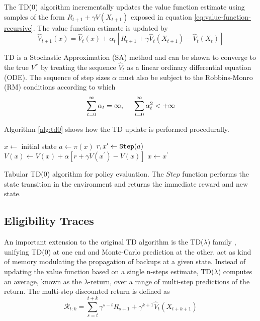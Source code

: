 The TD(0) algorithm incrementally updates the value function estimate using samples
of the form $R_{t+1} + \gamma V(X_{t+1})$ exposed in equation \ref{eq:value-function-recursive}. The value function estimate is updated by
\begin{equation}
\hat{V}_{t+1}(x) = \hat{V}_{t}(x) + \alpha_t \left[ R_{t+1} + \gamma \hat{V}_t (X_{t+1})
- \hat{V}_t(X_t)\right] \label{eq:tdupdate}
\end{equation}

TD is a Stochastic Approximation (SA) method and can be shown to converge \parencite{Csaba2010} to the true $V^\pi$ by treating the sequence $\hat{V}_t$ as a linear ordinary differential equation (ODE). The sequence of step sizes $\alpha$ must also be subject to the Robbins-Monro (RM) conditions according to which
\begin{equation}
\sum_{t=0}^\infty \alpha_t = \infty, \hspace{5mm} 
\sum_{t=0}^\infty \alpha_t^2 < + \infty
\end{equation}

Algorithm \ref{alg:td0} shows how the TD update is performed procedurally.

\begin{algorithm}
\DontPrintSemicolon
{}
$x \leftarrow$ initial state\;
 {
$a \leftarrow \pi(x)$\;
$r, x^\prime \leftarrow \FuncSty{Step}(a)$\;
$V(x) \leftarrow V(x) + \alpha\left[ r + \gamma V(x^\prime) - V(x) \right]$ \;
$x \leftarrow x^\prime$
}
\caption{Tabular TD(0) algorithm for policy evaluation. The $Step$ function performs
the state transition in the environment and returns the immediate reward and new state.}
\label{alg:td0}
\end{algorithm}

\subsection{Eligibility Traces}

An important extension to the original TD algorithm is the TD($\lambda$) family
\parencite{Sutton1984}, unifying TD(0) at one end and Monte-Carlo prediction at the other.
 act as kind of memory modulating the propagation of backups at a given state. Instead of updating the value function based on 
a single n-steps estimate, TD($\lambda$) computes an average, known as the
$\lambda$-return, over a range of multi-step predictions of the return. The multi-step discounted return is  defined as
\begin{equation}
\mathcal{R}_{t:k} = \sum_{s=t}^{t+k} \gamma^{s-t}R_{s+1} +
\gamma^{k+1}\hat{V}_t(X_{t+k+1})
\end{equation}

